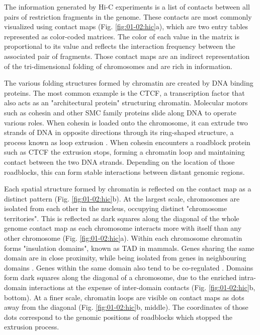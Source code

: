 The information generated by Hi-C experiments is a list of contacts between all pairs of restriction fragments in the genome. These contacts are most commonly visualized using contact maps (Fig. \ref{fig:01-02:hic}a), which are two entry tables represented as color-coded matrices. The color of each value in the matrix is proportional to its value and reflects the interaction frequency between the associated pair of fragments. Those contact maps are an indirect representation of the tri-dimensional folding of chromosomes and are rich in information.

The various folding structures formed by chromatin are created by DNA binding proteins. The most common example is the \acrfull{CTCF}, a transcription factor that also acts as an "architectural protein" structuring chromatin. Molecular motors such as cohesin and other \acrfull{SMC} family proteins slide along DNA to operate various roles. When cohesin is loaded onto the chromosome, it can extrude two strands of DNA in opposite directions through its ring-shaped structure, a process known as loop extrusion \cite{fudenbergFormationChromosomalDomains2016}. When cohesin encounters a roadblock protein such as \acrshort{CTCF} the extrusion stops, forming a chromatin loop and maintaining contact between the two DNA strands. Depending on the location of those roadblocks, this can form stable interactions between distant genomic regions. 

Each spatial structure formed by chromatin is reflected on the contact map as a distinct pattern (Fig. \ref{fig:01-02:hic}b). At the largest scale, chromosomes are isolated from each other in the nucleus, occupying distinct "chromosome territories". This is reflected as dark squares along the diagonal of the whole genome contact map as each chromosome interacts more with itself than any other chromosome (Fig. \ref{fig:01-02:hic}a). Within each chromosome chromatin forms "insulation domains", known as \acrfull{TAD} in mammals. Genes sharing the same domain are in close proximity, while being isolated from genes in neighbouring domains . Genes within the same domain also tend to be co-regulated \cite{noraSpatialPartitioningRegulatory2012}. Domains form dark squares along the diagonal of a chromosome, due to the enriched intra-domain interactions at the expense of inter-domain contacts (Fig. \ref{fig:01-02:hic}b, bottom). At a finer scale, chromatin loops are visible on contact maps as dots away from the diagonal (Fig. \ref{fig:01-02:hic}b, middle). The coordinates of those dots correspond to the genomic positions of roadblocks which stopped the extrusion process.

